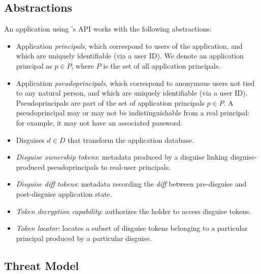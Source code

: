 \subsection{\sys Abstractions}
An application using \sys's API works with the following \sys abstractions:
\begin{itemize}
    \item Application \emph{principals}, which correspond to users of the application, 
	and which are uniquely identifiable (\eg via a user ID).
	We denote an application principal as $p \in P$, where $P$ is the set of all application principals.
    \item Application \emph{pseudoprincipals}, which correspond to anonymous users not tied to any natural
    person, and which are uniquely identifiable (\eg via a user ID).
	Pseudoprincipals are part of the set of application principals $p \in P$.
    A pseudoprincipal may or may not be indistinguishable from a real principal: for example, it 
        may not have an associated password.
    \item Disguises $d \in D$ %
        that transform the application database.
    \item \emph{Disguise ownership tokens}: metadata produced by a disguise linking
        disguise-produced pseudoprincipals to real-user principals.
    \item \emph{Disguise diff tokens}: metadata recording the \emph{diff} between pre-disguise and
        post-disguise application state.
    \item \emph{Token decryption capability}: authorizes the holder to access disguise tokens.
    \item \emph{Token locator}: locates a subset of disguise tokens belonging to a particular
        principal produced by a particular disguise.
\end{itemize}

\subsection{Threat Model}
\label{s:threat}


